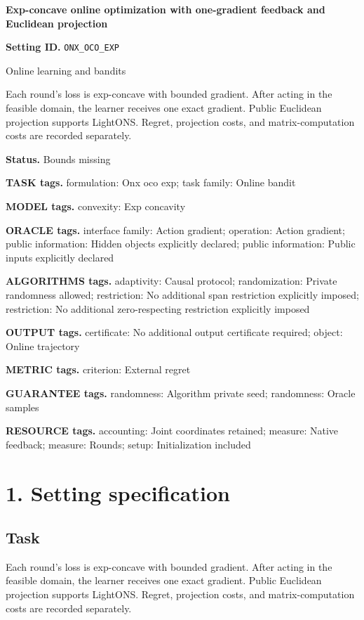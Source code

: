 \documentclass[10pt,a4paper]{article}
\begin{document}
\raggedright

{\LARGE\bfseries\sffamily\color{AtlasNavy} Exp-concave online optimization with one-gradient feedback and Euclidean projection\par}\vspace{5pt}
\textbf{Setting ID.} \texttt{ONX\_\allowbreak{}OCO\_\allowbreak{}EXP}

Online learning and bandits

Each round's loss is exp-concave with bounded gradient. After acting in the feasible domain, the learner receives one exact gradient. Public Euclidean projection supports LightONS. Regret, projection costs, and matrix-computation costs are recorded separately.

\textbf{Status.} Bounds missing

\textbf{TASK tags.} formulation: Onx oco exp; task family: Online bandit

\textbf{MODEL tags.} convexity: Exp concavity

\textbf{ORACLE tags.} interface family: Action gradient; operation: Action gradient; public information: Hidden objects explicitly declared; public information: Public inputs explicitly declared

\textbf{ALGORITHMS tags.} adaptivity: Causal protocol; randomization: Private randomness allowed; restriction: No additional span restriction explicitly imposed; restriction: No additional zero-respecting restriction explicitly imposed

\textbf{OUTPUT tags.} certificate: No additional output certificate required; object: Online trajectory

\textbf{METRIC tags.} criterion: External regret

\textbf{GUARANTEE tags.} randomness: Algorithm private seed; randomness: Oracle samples

\textbf{RESOURCE tags.} accounting: Joint coordinates retained; measure: Native feedback; measure: Rounds; setup: Initialization included

\section{1. Setting specification}
\subsection{Task}
Each round's loss is exp-concave with bounded gradient. After acting in the feasible domain, the learner receives one exact gradient. Public Euclidean projection supports LightONS. Regret, projection costs, and matrix-computation costs are recorded separately.
\end{document}
